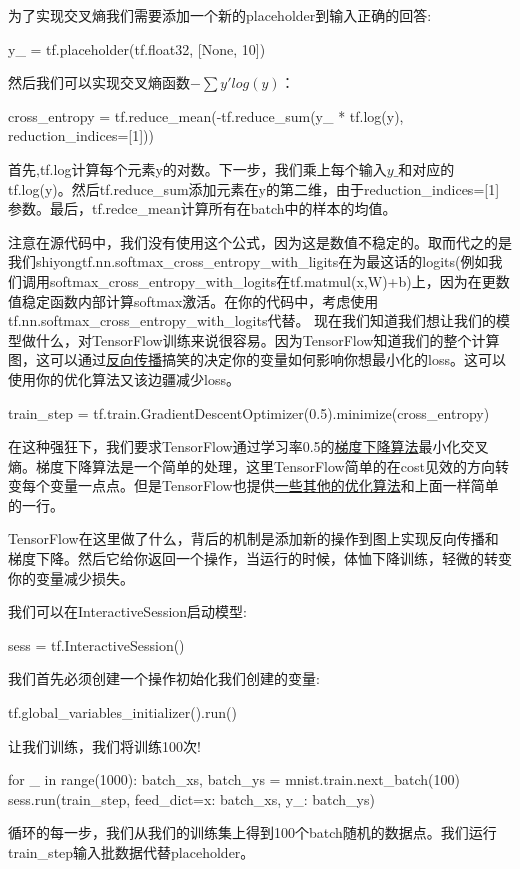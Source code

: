 为了实现交叉熵我们需要添加一个新的placeholder到输入正确的回答:
\begin{pythoncode}
y_ = tf.placeholder(tf.float32, [None, 10])
\end{pythoncode}
然后我们可以实现交叉熵函数$-\sum y'log(y)$：
\begin{pythoncode}
cross_entropy = tf.reduce_mean(-tf.reduce_sum(y_ * tf.log(y), reduction_indices=[1]))
\end{pythoncode}
首先,tf.log计算每个元素y的对数。下一步，我们乘上每个输入$y\_$和对应的tf.log(y)。然后tf.reduce\_sum添加元素在y的第二维，由于reduction\_indices=[1]参数。最后，tf.redce\_mean计算所有在batch中的样本的均值。

注意在源代码中，我们没有使用这个公式，因为这是数值不稳定的。取而代之的是我们shiyongtf.nn.softmax\_cross\_entropy\_with\_ligits在为最这话的logits(例如我们调用softmax\_cross\_entropy\_with\_logits在tf.matmul(x,W)+b)上，因为在更数值稳定函数内部计算softmax激活。在你的代码中，考虑使用tf.nn.softmax\_cross\_entropy\_with\_logits代替。
现在我们知道我们想让我们的模型做什么，对TensorFlow训练来说很容易。因为TensorFlow知道我们的整个计算图，这可以通过\href{https://colah.github.io/posts/2015-08-Backprop}{反向传播}搞笑的决定你的变量如何影响你想最小化的loss。这可以使用你的优化算法又该边疆减少loss。
\begin{pythoncode}
train_step = tf.train.GradientDescentOptimizer(0.5).minimize(cross_entropy)
\end{pythoncode}
在这种强狂下，我们要求TensorFlow通过学习率0.5的\href{https://en.wikipedia.org/wiki/Gradient_descent}{梯度下降算法}最小化交叉熵。梯度下降算法是一个简单的处理，这里TensorFlow简单的在cost见效的方向转变每个变量一点点。但是TensorFlow也提供\href{https://www.tensorflow.org/api_guides/python/train#Optimizers}{一些其他的优化算法}和上面一样简单的一行。

TensorFlow在这里做了什么，背后的机制是添加新的操作到图上实现反向传播和梯度下降。然后它给你返回一个操作，当运行的时候，体恤下降训练，轻微的转变你的变量减少损失。

我们可以在InteractiveSession启动模型:
\begin{pythoncode}
sess = tf.InteractiveSession()
\end{pythoncode}
我们首先必须创建一个操作初始化我们创建的变量:
\begin{pythoncode}
tf.global_variables_initializer().run()
\end{pythoncode}
让我们训练，我们将训练100次!
\begin{pythoncode}
for _ in range(1000):
  batch_xs, batch_ys = mnist.train.next_batch(100)
	  sess.run(train_step, feed_dict={x: batch_xs, y_: batch_ys})
\end{pythoncode}
循环的每一步，我们从我们的训练集上得到100个batch随机的数据点。我们运行train\_step输入批数据代替placeholder。

